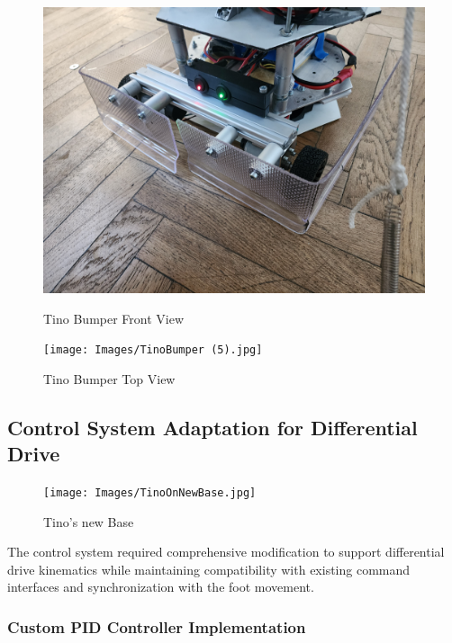\begin{figure}[H]
    \centering
    \begin{minipage}{0.45\textwidth}
        \centering
        \includegraphics[width=\textwidth]{Images/TinoBumper (4).jpg}
        \caption{Tino Bumper Front View}
        \label{fig:tino_bumper_front}
    \end{minipage}
    \hfill
    \begin{minipage}{0.45\textwidth}
        \centering
        \texttt{[image: Images/TinoBumper (5).jpg]}
        \caption{Tino Bumper Top View}
        \label{fig:tino_bumper_top}
    \end{minipage}
\end{figure}

\subsection{Control System Adaptation for Differential Drive}

\begin{figure}[H]
    \centering    \texttt{[image: Images/TinoOnNewBase.jpg]}
    \caption{Tino's new Base}
    \label{fig:tino_on_new_base}
\end{figure}

The control system required comprehensive modification to support differential drive kinematics while maintaining compatibility with existing command interfaces and synchronization with the foot movement.

\subsubsection{Custom PID Controller Implementation}

